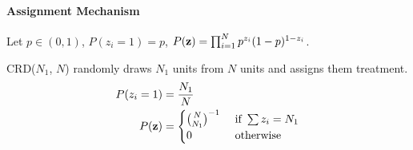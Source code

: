 \documentclass[11pt]{article}
\begin{document}
	\paragraph{Assignment Mechanism}
	\begin{example}
		Let $p \in (0, 1)$, $P(z_i = 1) = p$, $P(\textbf{z}) = \prod_{i=1}^N p^{z_i} (1-p)^{1-z_i}$.
	\end{example}
	
	\begin{example}
		CRD($N_1$, $N$) randomly draws $N_1$ units from $N$ units and assigns them treatment.
		\begin{align}
			P(z_i=1) &= \frac{N_1}{N} \\
			P(\textbf{z}) &= \begin{cases}
				{N \choose N_1}^{-1} &\text{{ if }} \sum z_i = N_1 \\
				0 &\text{{ otherwise}}
			\end{cases}
		\end{align}
	\end{example}
\end{document}

